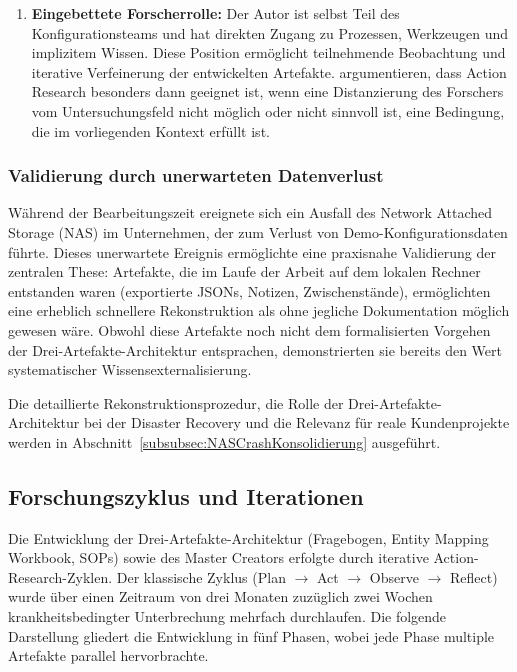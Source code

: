 \begin{enumerate}
    \item \textbf{Eingebettete Forscherrolle:} Der Autor ist selbst Teil des Konfigurationsteams und hat direkten Zugang zu Prozessen, Werkzeugen und implizitem Wissen. Diese Position ermöglicht teilnehmende Beobachtung und iterative Verfeinerung der entwickelten Artefakte. \cite{susman:action_research1983} argumentieren, dass Action Research besonders dann geeignet ist, wenn eine Distanzierung des Forschers vom Untersuchungsfeld nicht möglich oder nicht sinnvoll ist, eine Bedingung, die im vorliegenden Kontext erfüllt ist.
\end{enumerate}

\subsubsection{Validierung durch unerwarteten Datenverlust}
\label{subsubsec:NASCrashValidierung}

Während der Bearbeitungszeit ereignete sich ein Ausfall des Network Attached Storage (NAS) im Unternehmen, der zum Verlust von Demo-Konfigurationsdaten führte. Dieses unerwartete Ereignis ermöglichte eine praxisnahe Validierung der zentralen These: Artefakte, die im Laufe der Arbeit auf dem lokalen Rechner entstanden waren (exportierte JSONs, Notizen, Zwischenstände), ermöglichten eine erheblich schnellere Rekonstruktion als ohne jegliche Dokumentation möglich gewesen wäre. Obwohl diese Artefakte noch nicht dem formalisierten Vorgehen der Drei-Artefakte-Architektur entsprachen, demonstrierten sie bereits den Wert systematischer Wissensexternalisierung.

Die detaillierte Rekonstruktionsprozedur, die Rolle der Drei-Artefakte-Architektur bei der Disaster Recovery und die Relevanz für reale Kundenprojekte werden in Abschnitt~\ref{subsubsec:NASCrashKonsolidierung} ausgeführt.


\subsection{Forschungszyklus und Iterationen}
\label{subsec:Forschungszyklus}

Die Entwicklung der Drei-Artefakte-Architektur (Fragebogen, Entity Mapping Workbook, SOPs) sowie des Master Creators erfolgte durch iterative Action-Research-Zyklen. Der klassische Zyklus (Plan $\rightarrow$ Act $\rightarrow$ Observe $\rightarrow$ Reflect) wurde über einen Zeitraum von drei Monaten zuzüglich zwei Wochen krankheitsbedingter Unterbrechung mehrfach durchlaufen. Die folgende Darstellung gliedert die Entwicklung in fünf Phasen, wobei jede Phase multiple Artefakte parallel hervorbrachte.


